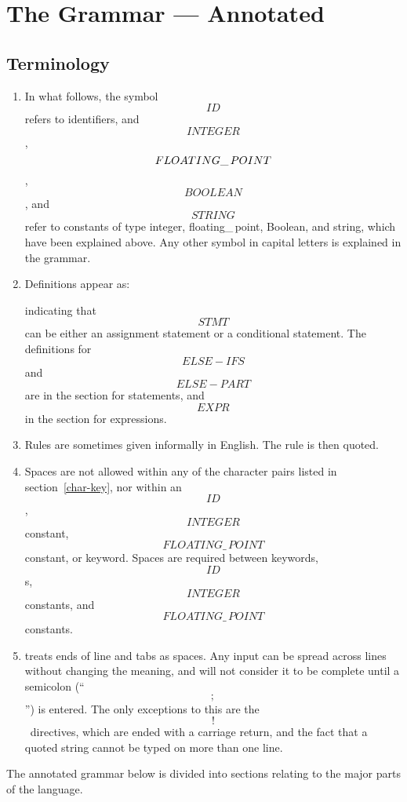 \newpage
{
\section{The \ISETL{} Grammar --- Annotated}	%
{}

\subsection{Terminology}

\begin{enumerate}

\item
In what follows, the symbol \[ID\] refers to identifiers,
and \[INTEGER\], \[FLOAT\-ING\_\,POINT\],
\[BOOLEAN\], and \[STRING\] refer to 
constants of type
integer, floating\_\,point, Boolean, and string,
which have been explained above.
Any other symbol in capital letters is explained in the grammar.

\item
Definitions appear as:

\noindent
indicating that \[STMT\] can be either an assignment statement or 
a conditional statement.
The definitions for \[ELSE-IFS\] and \[ELSE-PART\] are in the
section for statements, and \[EXPR\] in the section for expressions.

\item
Rules are sometimes given informally in English.
The rule is then quoted.

\item
Spaces are not allowed within any of the character pairs
listed in section~\ref{char-key},
nor within an \[ID\], \[INTEGER\] constant,
\[FLOATING\_\,POINT\] constant, or keyword.
Spaces are required between keywords, \[ID\]s, \[INTEGER\] constants,
and \[FLOATING\_\,POINT\] constants.

\item
\ISETL{} treats ends of line and tabs as spaces.
Any input can be spread across lines without changing the meaning,
and \ISETL{} will not
consider it to be complete until a semicolon (``\[;\]'') is entered.
The only exceptions to this are the \[!\]~directives,
which are ended with a carriage return,
and the fact that a quoted string cannot be typed on more than one line.
\end{enumerate}


The annotated grammar below is divided into sections relating to the
major parts of the language.

}
